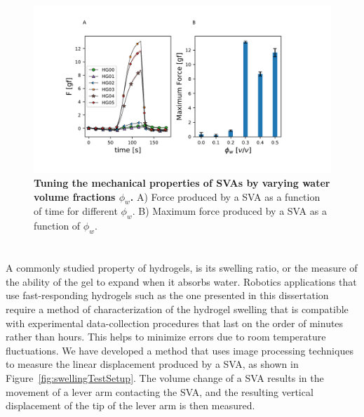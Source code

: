 \begin{figure}[!htb]
\centering
\includegraphics[width=.8\textwidth]{svaForce.pdf}
    \caption[]{\textbf{Tuning the mechanical properties of SVAs by varying water volume fractions $\phi_{w}$.} A) Force produced by a SVA as a function of time for different $\phi_{w}$. B) Maximum force produced by a SVA as a function of $\phi_{w}$. }
    \label{fig:svaForce}
\end{figure}

\section{}
A commonly studied property of hydrogels, is its swelling ratio, or the measure of the ability of the gel to expand when it absorbs water. Robotics applications that use fast-responding hydrogels such as the one presented in this dissertation require a method of characterization of the hydrogel swelling that is compatible with experimental data-collection procedures that last on the order of minutes rather than hours.  This helps to minimize errors due to room temperature fluctuations. We have developed a method that uses image processing techniques to measure the linear displacement produced by a SVA, as shown in Figure~\ref{fig:swellingTestSetup}. The volume change of a SVA results in the movement of a lever arm contacting the SVA, and the resulting vertical displacement of the tip of the lever arm is then measured. 

